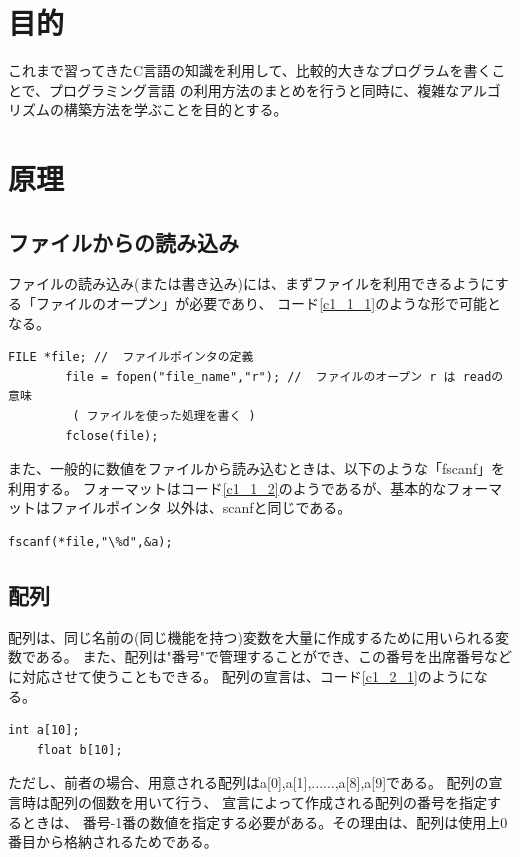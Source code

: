 \documentclass{jsarticle}
\begin{document}
\section{目的}
これまで習ってきたC言語の知識を利用して、比較的大きなプログラムを書くことで、プログラミング言語
の利用方法のまとめを行うと同時に、複雑なアルゴリズムの構築方法を学ぶことを目的とする。

\section{原理}
\subsection{ファイルからの読み込み}
  ファイルの読み込み(または書き込み)には、まずファイルを利用できるようにする「ファイルのオープン」が必要であり、
  コード\ref{c1_1_1}のような形で可能となる。

    \begin{lstlisting}[caption=ファイルからの読み込み1\label{c1_1_1}]
        FILE *file; //  ファイルポインタの定義
        file = fopen("file_name","r"); //  ファイルのオープン r は readの意味
         ( ファイルを使った処理を書く )
        fclose(file);
    \end{lstlisting}

  また、一般的に数値をファイルから読み込むときは、以下のような「fscanf」を利用する。
  フォーマットはコード\ref{c1_1_2}のようであるが、基本的なフォーマットはファイルポインタ
  以外は、scanfと同じである。
  \begin{lstlisting}[caption=ファイルからの読み込み2\label{c1_1_2}]
    fscanf(*file,"\%d",&a);
  \end{lstlisting}

\subsection{配列}
  配列は、同じ名前の(同じ機能を持つ)変数を大量に作成するために用いられる変数である。
  また、配列は"番号"で管理することができ、この番号を出席番号などに対応させて使うこともできる。
  配列の宣言は、コード\ref{c1_2_1}のようになる。
  \begin{lstlisting}[caption=配列の宣言\label{c1_2_1}]
    int a[10];
    float b[10];
  \end{lstlisting}
  ただし、前者の場合、用意される配列はa[0],a[1],......,a[8],a[9]である。
  配列の宣言時は配列の個数を用いて行う、
  宣言によって作成される配列の番号を指定するときは、
  番号-1番の数値を指定する必要がある。その理由は、配列は使用上0番目から格納されるためである。
\end{document}
